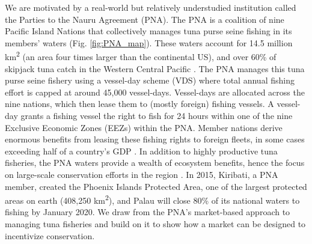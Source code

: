 \documentclass[12pt]{article}
\begin{document}
We are motivated by a real-world but relatively understudied institution called the Parties to the Nauru Agreement (PNA). The PNA is a coalition of nine Pacific Island Nations that collectively manages tuna purse seine fishing in its members' waters \cite{havice_2013,aqorau_2018} (Fig. \ref{fig:PNA_map}). These waters account for 14.5 million km\textsuperscript{2} (an area four times larger than the continental US), and over 60\% of skipjack tuna catch in the Western Central Pacific \cite{havice_2013}. The PNA manages this tuna purse seine fishery using a vessel-day scheme (VDS) where total annual fishing effort is capped at around 45,000 vessel-days. Vessel-days are allocated across the nine nations, which then lease them to (mostly foreign) fishing vessels. A vessel-day grants a fishing vessel the right to fish for 24 hours within one of the nine Exclusive Economic Zones (EEZs) within the PNA. Member nations derive enormous benefits from leasing these fishing rights to foreign fleets, in some cases exceeding half of a country's GDP \cite{ffa_2017b}. In addition to highly productive tuna fisheries, the PNA waters provide a wealth of ecosystem benefits, hence the focus on large-scale conservation efforts in the region \cite{mcleod_2019}. In 2015, Kiribati, a PNA member, created the Phoenix Islands Protected Area, one of the largest protected areas on earth (408,250 km\textsuperscript{2}), and Palau will close 80\% of its national waters to fishing by January 2020. We draw from the PNA's market-based approach to managing tuna fisheries and build on it to show how a market can be designed to incentivize conservation.
\end{document}
